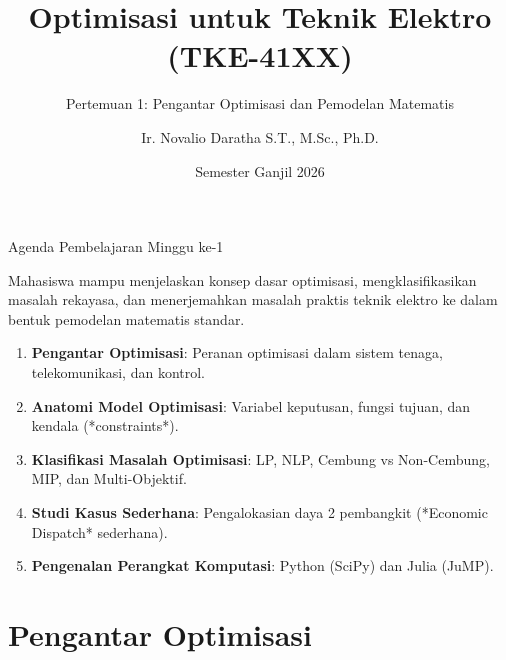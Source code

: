 \documentclass[10pt,aspectratio=169]{beamer}
\title[Optimisasi TE: Pertemuan 1]{Optimisasi untuk Teknik Elektro (TKE-41XX)}
\subtitle{Pertemuan 1: Pengantar Optimisasi dan Pemodelan Matematis}
\author[N. Daratha]{Ir. Novalio Daratha S.T., M.Sc., Ph.D.}
\institute[Teknik Elektro UNIB]{Program Studi S1 Teknik Elektro\\Fakultas Teknik --- Universitas Bengkulu}
\date{Semester Ganjil 2026}
\begin{document}
\begin{frame}
    \titlepage
\end{frame}

\begin{frame}{Agenda Pembelajaran Minggu ke-1}
    \begin{tcolorbox}[colback=unibblue!5,colframe=unibblue,title=\textbf{Tujuan Pembelajaran (CPMK-1 dan CPMK-2)}]
        Mahasiswa mampu menjelaskan konsep dasar optimisasi, mengklasifikasikan masalah rekayasa, dan menerjemahkan masalah praktis teknik elektro ke dalam bentuk pemodelan matematis standar.
    \end{tcolorbox}

    \vspace{0.3cm}
    \begin{enumerate}
        \item \textbf{Pengantar Optimisasi}: Peranan optimisasi dalam sistem tenaga, telekomunikasi, dan kontrol.
        \item \textbf{Anatomi Model Optimisasi}: Variabel keputusan, fungsi tujuan, dan kendala (*constraints*).
        \item \textbf{Klasifikasi Masalah Optimisasi}: LP, NLP, Cembung vs Non-Cembung, MIP, dan Multi-Objektif.
        \item \textbf{Studi Kasus Sederhana}: Pengalokasian daya 2 pembangkit (*Economic Dispatch* sederhana).
        \item \textbf{Pengenalan Perangkat Komputasi}: Python (SciPy) dan Julia (JuMP).
    \end{enumerate}
\end{frame}

\section{Pengantar Optimisasi}
\end{document}
